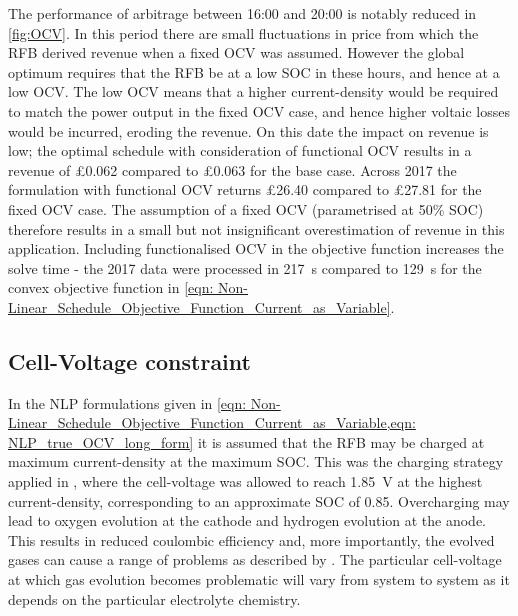 \documentclass[preprint,3p,review,authoryear,10pt]{elsarticle}
\begin{document}
The performance of arbitrage between 16:00 and 20:00 is notably reduced in \cref{fig:OCV}. In this period there are small fluctuations in price from which the RFB derived revenue when a fixed OCV was assumed. However the global optimum requires that the RFB be at a low SOC in these hours, and hence at a low OCV. The low OCV means that a higher current-density would be required to match the power output in the fixed OCV case, and hence higher voltaic losses would be incurred, eroding the revenue. On this date the impact on revenue is low; the optimal schedule with consideration of functional OCV results in a revenue of \pounds 0.062 compared to \pounds 0.063 for the base case. Across 2017 the formulation with functional OCV returns \pounds 26.40 compared to \pounds 27.81 for the fixed OCV case. The assumption of a fixed OCV (parametrised at 50\% SOC) therefore results in a small but not insignificant overestimation of revenue in this application. Including functionalised OCV in the objective function increases the solve time - the 2017 data were processed in \SI{217}{\second} compared to \SI{129}{\second} for the convex objective function in \cref{eqn: Non-Linear_Schedule_Objective_Function_Current_as_Variable}. 


\subsection{Cell-Voltage constraint}
\label{Results_Cell_Voltage_Constraint}
In the NLP formulations given in \cref{eqn: Non-Linear_Schedule_Objective_Function_Current_as_Variable,eqn: NLP_true_OCV_long_form} it is assumed that the RFB may be charged at maximum current-density at the maximum SOC. This was the charging strategy applied in \cite{Reed2016}, where the cell-voltage was allowed to reach \SI{1.85}{\volt} at the highest current-density, corresponding to an approximate SOC of 0.85. Overcharging may lead to oxygen evolution at the cathode and hydrogen evolution at the anode. This results in reduced coulombic efficiency and, more importantly, the evolved gases can cause a range of problems as described by \cite{Kear2012}.  The particular cell-voltage at which gas evolution becomes problematic will vary from system to system as it depends on the particular electrolyte chemistry. 
\end{document}
